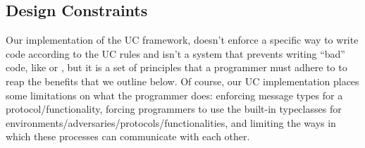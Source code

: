 \subsection{Design Constraints}
Our implementation of the UC framework, doesn't enforce a specific way to write code according to the UC rules and isn't a system that prevents writing ``bad'' code, like \cite{mace} or \cite{verdi}, but it is a set of principles that a programmer must adhere to to reap the benefits that we outline below.
Of course, our UC implementation places some limitations on what the programmer does: enforcing message types for a protocol/functionality, forcing programmers to use the built-in typeclasses for environments/adversaries/protocols/functionalities, and limiting the ways in which these processes can communicate with each other.

